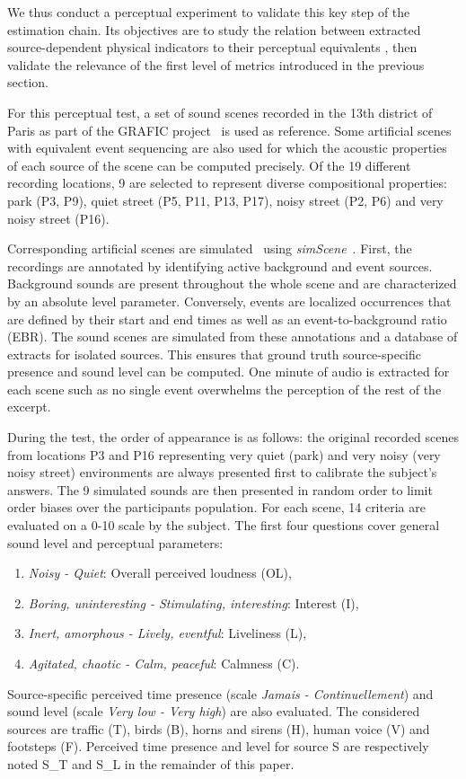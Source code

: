 \documentclass{article}
\begin{document}
\begin{sloppy}
We thus conduct a perceptual experiment to validate this key step of the estimation chain. Its objectives are to study the relation between extracted source-dependent physical indicators to their perceptual equivalents  , then validate the relevance of the first level of metrics introduced in the previous section.

For this perceptual test, a set of sound scenes recorded in the 13th district of Paris as part of the GRAFIC project~\cite{aumond2017} is used as reference. Some artificial scenes with equivalent event sequencing are also used for which the acoustic properties of each source of the scene can be computed precisely. Of the 19 different recording locations, 9 are selected to represent diverse compositional properties: park (P3, P9), quiet street (P5, P11, P13, P17), noisy street (P2, P6) and very noisy street (P16).

Corresponding artificial scenes are simulated~\cite{gloaguen2017} using \textit{simScene}~\cite{rossignol2015}. First, the recordings are annotated by identifying active background and event sources. Background sounds are present throughout the whole scene and are characterized by an absolute level parameter. Conversely, events are localized occurrences that are defined by their start and end times as well as an event-to-background ratio (EBR). The sound scenes are simulated from these annotations and a database of extracts for isolated sources. This ensures that ground truth source-specific presence and sound level can be computed. One minute of audio is extracted for each scene such as no single event overwhelms the perception of the rest of the excerpt.

During the test, the order of appearance is as follows: the original recorded scenes from locations P3 and P16 representing very quiet (park) and very noisy (very noisy street) environments are always presented first to calibrate the subject's answers. The 9 simulated sounds are then presented in random order to limit order biases over the participants population. For each scene, 14 criteria are evaluated on a 0-10 scale by the subject. The first four questions cover general sound level and perceptual parameters:
\begin{enumerate}
\item \textit{Noisy - Quiet}: Overall perceived loudness (OL),
\item \textit{Boring, uninteresting - Stimulating, interesting}: Interest (I),
\item \textit{Inert, amorphous - Lively, eventful}: Liveliness (L),
\item \textit{Agitated, chaotic - Calm, peaceful}: Calmness (C).
\end{enumerate}
Source-specific perceived time presence (scale \textit{Jamais - Continuellement}) and sound level (scale \textit{Very low - Very high}) are also evaluated. The considered sources are traffic (T), birds (B), horns and sirens (H), human voice (V) and footsteps (F). Perceived time presence and level for source S are respectively noted S\_T and S\_L in the remainder of this paper.


\end{sloppy}
\end{document}
